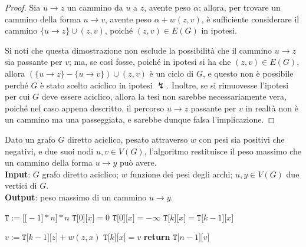 \documentclass[14pt]{extreport}
\theoremstyle{definition}
\theoremstyle{definition}
\begin{document}
\begin{proof}
    Sia $u \rightarrow z$ un cammino da $u$ a $z$, avente peso $\alpha$; allora, per trovare un cammino della forma $u \rightarrow v$, avente peso $\alpha + w(z, v)$, è sufficiente considerare il cammino $\{u \rightarrow z\} \cup (z, v)$, poiché $(z, v) \in E(G)$ in ipotesi.

    Si noti che questa dimostrazione non esclude la possibilità che il cammino $u \rightarrow z$ sia passante per $v$; ma, se così fosse, poiché in ipotesi si ha che $(z, v) \in E(G)$, allora $(\{u \rightarrow z\} - \{u \rightarrow v\}) \cup (z, v)$ è un ciclo di $G$, e questo non è possibile perché $G$ è stato scelto aciclico in ipotesi $\lightning$. Inoltre, se si rimuovesse l'ipotesi per cui $G$ deve essere aciclico, allora la tesi non sarebbe necessariamente vera, poiché nel caso appena descritto, il percorso $u \rightarrow z$ passante per $v$ in realtà non è un cammino ma una passeggiata, e sarebbe dunque falsa l'implicazione.
\end{proof}

\begin{algorithm}[H]
    \caption{
        Dato un grafo $G$ diretto aciclico, pesato attraverso $w$ con pesi sia positivi che negativi, e due suoi nodi $u, v \in V(G)$, l'algoritmo restituisce il peso massimo che un cammino della forma $u \rightarrow y$ può avere.\\
        \textbf{Input}: $G$ grafo diretto aciclico; $w$ funzione dei pesi degli archi; $u, y \in V(G)$ due vertici di $G$.\\
        \textbf{Output}: peso massimo di un cammino $u \rightarrow y$.
    }

    \begin{algorithmic}[1]
        \label{maxWeightPaths}
            \State $\texttt{T} := \texttt{[[}-1\texttt{]} * n \texttt{]} * n$
                    \State $\texttt{T[}0\texttt{][}x\texttt{]} = 0$
                \Else
                    \State $\texttt{T[}0\texttt{][}x\texttt{]} = - \infty$
                \EndIf
            \EndFor
                    \State $\texttt{T[}k\texttt{][}x\texttt{]} = \texttt{T[}k -1 \texttt{][}x\texttt{]}$ 

                     
                        \State $v := \texttt{T[}k-1\texttt{][}z\texttt{]} + w(z, x)$
                            \State $\texttt{T[}k\texttt{][}x\texttt{]} = v$
                        \EndIf
                    \EndFor
                \EndFor
            \EndFor
            \State \textbf{return} $\texttt{T[}n- 1\texttt{][}v\texttt{]}$
        \EndFunction
    \end{algorithmic}
\end{algorithm}
\end{document}
